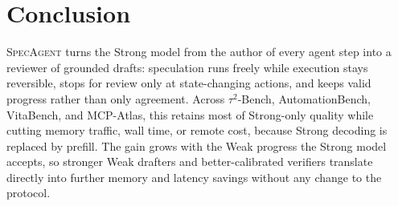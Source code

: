 \documentclass[11pt, copyright, logo, secondlogo]{template/lark}
\newcommand{\SpecAgent}{\textsc{SpecAgent}\xspace}
\begin{document}
\section{Conclusion}
\label{sec:conclusion}

\SpecAgent{} turns the Strong model from the author of every agent step into a
reviewer of grounded drafts: speculation runs freely while execution stays
reversible, stops for review only at state-changing actions, and keeps valid
progress rather than only agreement. Across $\tau^2$-Bench, AutomationBench,
VitaBench, and MCP-Atlas, this retains most of Strong-only quality while cutting memory
traffic, wall time, or remote cost, because Strong decoding is replaced by
prefill. The gain grows with the Weak progress the Strong model accepts, so
stronger Weak drafters \citep{xu2026envfactory} and better-calibrated verifiers translate directly
into further memory and latency savings without any change to the protocol.
 
\clearpage
\end{document}
